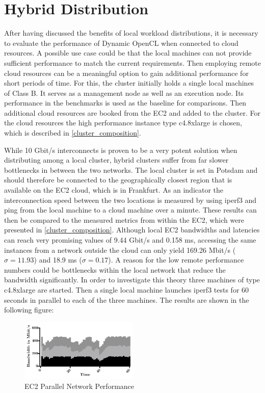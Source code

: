 \section{Hybrid Distribution}

After having discussed the benefits of local workload distributions, it is necessary to evaluate the performance of Dynamic OpenCL when connected to cloud resources. A possible use case could be that the local machines can not provide sufficient performance to match the current requirements. Then employing remote cloud resources can be a meaningful option to gain additional performance for short periods of time. For this, the cluster initially holds a single local machines of Class B. It serves as a management node as well as an execution node. Its performance in the benchmarks is used as the baseline for comparisons. Then additional cloud resources are booked from the EC2 and added to the cluster. For the cloud resources the high performance instance type c4.8xlarge is chosen, which is described in \ref{cluster_composition}.

While 10 Gbit/s interconnects is proven to be a very potent solution when distributing among a local cluster, hybrid clusters suffer from far slower bottlenecks in between the two networks. The local cluster is set in Potsdam and should therefore be connected to the geographically closest region that is available on the EC2 cloud, which is in Frankfurt. As an indicator the interconnection speed between the two locations is measured by using iperf3 and ping from the local machine to a cloud machine over a minute. These results can then be compared to the measured metrics from within the EC2, which were presented in \ref{cluster_composition}. Although local EC2 bandwidths and latencies can reach very promising values of 9.44 Gbit/s and 0.158 ms, accessing the same instances from a network outside the cloud can only yield 169.26 Mbit/s ($\sigma = 11.93$) and 18.9 ms ($\sigma = 0.17$). A reason for the low remote performance numbers could be bottlenecks within the local network that reduce the bandwidth significantly. In order to investigate this theory three machines of type c4.8xlarge are started. Then a single local machine launches iperf3 tests for 60 seconds in parallel to each of the three machines. The results are shown in the following figure:

\begin{figure}[H]
	\includegraphics[width=0.5\textwidth]{images/ec2_stacked_network_performance.pdf}
	\centering
	\caption{EC2 Parallel Network Performance}
	\label{img:EC2 Parallel Network Performance}
\end{figure}

